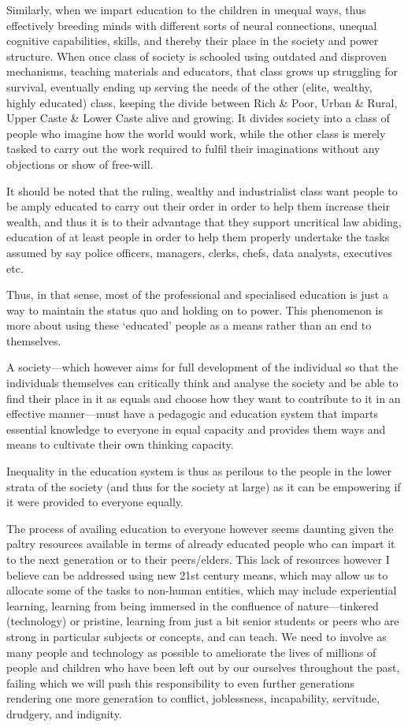 Similarly, when we impart education to the children in unequal ways,
thus effectively breeding minds with different sorts of neural
connections, unequal cognitive capabilities, skills, and thereby their
place in the society and power structure. When once class of society is
schooled using outdated and disproven mechanisms, teaching materials and
educators, that class grows up struggling for survival, eventually
ending up serving the needs of the other (elite, wealthy, highly
educated) class, keeping the divide between Rich \& Poor, Urban \&
Rural, Upper Caste \& Lower Caste alive and growing. It divides society
into a class of people who imagine how the world would work, while the
other class is merely tasked to carry out the work required to fulfil
their imaginations without any objections or show of free-will.

It should be noted that the ruling, wealthy and industrialist class want
people to be amply educated to carry out their order in order to help
them increase their wealth, and thus it is to their advantage that they
support uncritical law abiding, education of at least people in order to
help them properly undertake the tasks assumed by say police officers,
managers, clerks, chefs, data analysts, executives etc.

Thus, in that sense, most of the professional and specialised education
is just a way to maintain the status quo and holding on to power. This
phenomenon is more about using these `educated' people as a means rather
than an end to themselves.

A society---which however aims for full development of the individual so
that the individuals themselves can critically think and analyse the
society and be able to find their place in it as equals and choose how
they want to contribute to it in an effective manner---must have a
pedagogic and education system that imparts essential knowledge to
everyone in equal capacity and provides them ways and means to cultivate
their own thinking capacity.

Inequality in the education system is thus as perilous to the people in
the lower strata of the society (and thus for the society at large) as
it can be empowering if it were provided to everyone equally.

The process of availing education to everyone however seems daunting
given the paltry resources available in terms of already educated people
who can impart it to the next generation or to their peers/elders. This
lack of resources however I believe can be addressed using new 21st
century means, which may allow us to allocate some of the tasks to
non-human entities, which may include experiential learning, learning
from being immersed in the confluence of nature---tinkered (technology)
or pristine, learning from just a bit senior students or peers who are
strong in particular subjects or concepts, and can teach. We need to
involve as many people and technology as possible to ameliorate the
lives of millions of people and children who have been left out by our
ourselves throughout the past, failing which we will push this
responsibility to even further generations rendering one more generation
to conflict, joblessness, incapability, servitude, drudgery, and
indignity.

